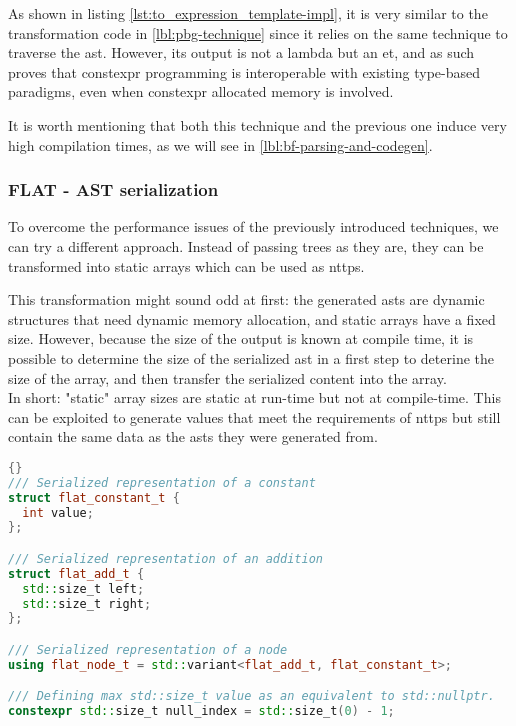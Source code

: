 \documentclass[../main]{subfiles}
\begin{document}
As shown in listing \ref{lst:to_expression_template-impl}, it is very similar
to the transformation code in \ref{lbl:pbg-technique} since it relies on
the same technique to traverse the \gls{ast}.
However, its output is not a \cpp lambda but an \acrlong{et}, and as such
proves that \gls{constexpr} programming is interoperable with existing
type-based paradigms, even when \gls{constexpr} allocated memory is involved.

It is worth mentioning that both this technique and the previous one induce
very high compilation times, as we will see in \ref{lbl:bf-parsing-and-codegen}.

\subsubsection{
  FLAT - AST serialization
}

\label{lbl:flat-technique}

To overcome the performance issues of the previously introduced techniques,
we can try a different approach. Instead of passing trees as they are,
they can be transformed into static arrays which can be used as \glspl{nttp}.

This transformation might sound odd at first: the generated \glspl{ast} are
dynamic structures that need dynamic memory allocation, and static arrays
have a fixed size. However, because the size of the output is known
at compile time, it is possible to determine the size of the serialized
\gls{ast} in a first step to deterine the size of the array,
and then transfer the serialized content into the array.
\\

In short: "static" array sizes are static at run-time but not at compile-time.
This can be exploited to generate values that meet the requirements
of \glspl{nttp} but still contain the same data as the \glspl{ast} they were
generated from.

\begin{lstlisting}[language=C++, label=lst:flat_struct_def]{}
/// Serialized representation of a constant
struct flat_constant_t {
  int value;
};

/// Serialized representation of an addition
struct flat_add_t {
  std::size_t left;
  std::size_t right;
};

/// Serialized representation of a node
using flat_node_t = std::variant<flat_add_t, flat_constant_t>;

/// Defining max std::size_t value as an equivalent to std::nullptr.
constexpr std::size_t null_index = std::size_t(0) - 1;
\end{lstlisting}
\end{document}
